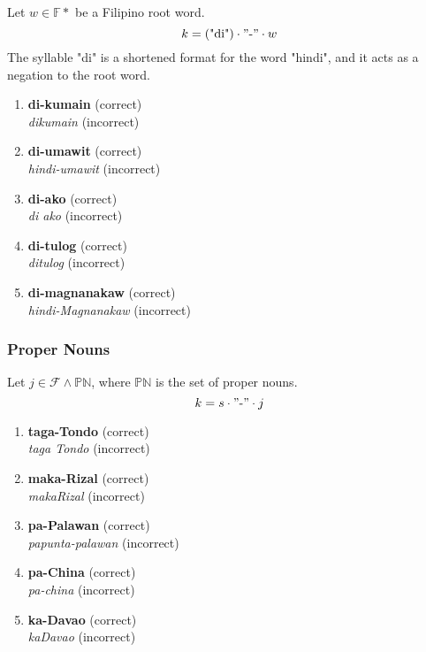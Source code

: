 Let \(w \in \mathbb{F}*\) be a Filipino root word.
\[
      k = (\text{"di"}) \cdot "\text{-}" \cdot w
\]
The syllable "di" is a shortened format for the word "hindi", and it acts as a negation to the root word.
\begin{example}
\end{example}
\begin{enumerate}
      \item \textbf{di-kumain} (correct) \\
            \textit{dikumain} (incorrect)
      \item \textbf{di-umawit} (correct) \\
            \textit{hindi-umawit} (incorrect)
      \item \textbf{di-ako} (correct) \\
            \textit{di ako} (incorrect)
      \item \textbf{di-tulog} (correct) \\
            \textit{ditulog} (incorrect)
      \item \textbf{di-magnanakaw} (correct) \\
            \textit{hindi-Magnanakaw} (incorrect)
\end{enumerate}

\subsubsection{Proper Nouns}

Let \(j \in \mathcal{F} \wedge \mathbb{PN}\), where \(\mathbb{PN}\) is the set of proper nouns.
\[
      k = s \cdot "\text{-}" \cdot j
\]
\begin{example}
\end{example}
\begin{enumerate}
      \item \textbf{taga-Tondo} (correct) \\
            \textit{taga Tondo} (incorrect)
      \item \textbf{maka-Rizal} (correct) \\
            \textit{makaRizal} (incorrect)
      \item \textbf{pa-Palawan} (correct) \\
            \textit{papunta-palawan} (incorrect)
      \item \textbf{pa-China} (correct) \\
            \textit{pa-china} (incorrect)
      \item \textbf{ka-Davao} (correct) \\
            \textit{kaDavao} (incorrect)
\end{enumerate}


